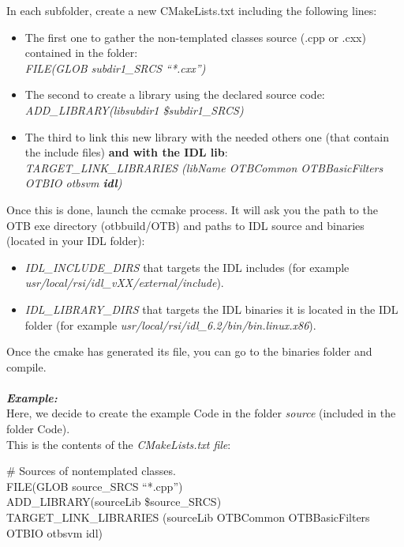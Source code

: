 In each subfolder, create a new CMakeLists.txt including the following lines:
\begin{itemize}
\item The first one to gather the non-templated classes source (.cpp or .cxx) contained in the folder:\\ 
  \emph {FILE(GLOB subdir1\_SRCS ``*.cxx'')}
\item The second to create a library using the declared source code:\\
  \emph{ADD\_LIBRARY(libsubdir1 \${subdir1\_SRCS})}
\item The third to link this new library with the needed others one (that contain the include files) \textbf{and with the IDL lib}:\\
\emph {TARGET\_LINK\_LIBRARIES (libName OTBCommon OTBBasicFilters OTBIO otbsvm \textbf{idl})}\\ 
\end{itemize}

Once this is done, launch the ccmake process. It will ask you the path to the OTB exe directory (\/otb\-build/OTB) and paths to IDL source and binaries (located in your IDL folder):
\begin{itemize}
\item \emph {IDL\_INCLUDE\_DIRS} that targets the IDL includes (for example \emph {usr/local/rsi/idl\_vXX/external/include}).
\item \emph {IDL\_LIBRARY\_DIRS} that targets the IDL binaries it is located in the IDL folder (for example \emph {usr/local/rsi/idl\_6.2/bin/bin.linux.x86}).
\end{itemize}
Once the cmake has generated its file, you can go to the binaries folder and compile.
\\
\\
\emph{\textbf{Example:}}\\
\indent Here, we decide to create the example Code in the folder \emph{source} (included in the folder Code).\\
\indent This is the contents of the \emph{CMakeLists.txt file}:\\
\begin{scriptsize}
\indent \# Sources of non\-templated classes.\\
\indent FILE(GLOB source\_SRCS ``*.cpp'')\\
\indent ADD\_LIBRARY(sourceLib \${source\_SRCS})\\
\indent TARGET\_LINK\_LIBRARIES (sourceLib OTBCommon OTBBasicFilters OTBIO otbsvm idl)\\
\end{scriptsize}



